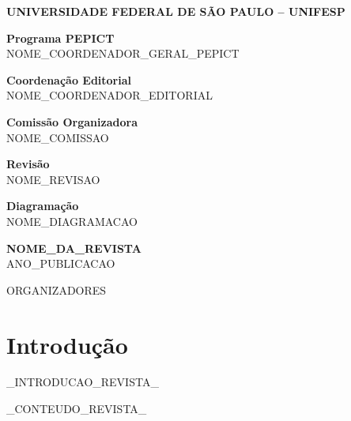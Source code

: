 \documentclass[12pt,openright,oneside,a4paper]{report}
\begin{document}
\begin{flushleft}
{\large \textbf{UNIVERSIDADE FEDERAL DE SÃO PAULO – UNIFESP}}
\vspace{1cm}

\textbf{Programa PEPICT} \\
NOME_COORDENADOR_GERAL_PEPICT
\vspace{0.7cm}

\textbf{Coordenação Editorial} \\
NOME_COORDENADOR_EDITORIAL
\vspace{0.7cm}

\textbf{Comissão Organizadora} \\
NOME_COMISSAO
\vspace{0.7cm}

\textbf{Revisão} \\
NOME_REVISAO
\vspace{0.7cm}

\textbf{Diagramação} \\
NOME_DIAGRAMACAO
\vspace{1.5cm}

\textbf{\large NOME_DA_REVISTA} \\
ANO_PUBLICACAO
\vspace{0.5cm}

ORGANIZADORES
\end{flushleft}
\clearpage

\tableofcontents
\clearpage

\chapter{Introdução}
_INTRODUCAO_REVISTA_
\clearpage

_CONTEUDO_REVISTA_
\end{document}
